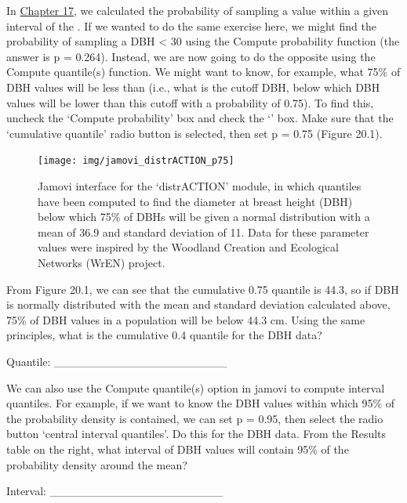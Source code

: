 \documentclass[
  openany]{krantz}
\begin{document}
In \protect\hyperlink{Chapter_17}{Chapter 17}, we calculated the probability of sampling a value within a given interval of the .
If we wanted to do the same exercise here, we might find the probability of sampling a DBH \textless{} 30 using the Compute probability function (the answer is p = 0.264).
Instead, we are now going to do the opposite using the Compute quantile(s) function.
We might want to know, for example, what 75\% of DBH values will be less than (i.e., what is the cutoff DBH, below which DBH values will be lower than this cutoff with a probability of 0.75).
To find this, uncheck the `Compute probability' box and check the `' box.
Make sure that the `cumulative quantile' radio button is selected, then set p = 0.75 (Figure 20.1).

\begin{figure}
\texttt{[image: img/jamovi\_distrACTION\_p75]} \caption{Jamovi interface for the `distrACTION' module, in which quantiles have been computed to find the diameter at breast height (DBH) below which 75\% of DBHs will be given a normal distribution with a mean of 36.9 and standard deviation of 11. Data for these parameter values were inspired by the Woodland Creation and Ecological Networks (WrEN) project.}\label{fig:unnamed-chunk-80}
\end{figure}

From Figure 20.1, we can see that the cumulative 0.75 quantile is 44.3, so if DBH is normally distributed with the mean and standard deviation calculated above, 75\% of DBH values in a population will be below 44.3 cm.
Using the same principles, what is the cumulative 0.4 quantile for the DBH data?

Quantile: \_\_\_\_\_\_\_\_\_\_\_\_\_\_\_\_\_\_\_\_\_

\newpage

We can also use the Compute quantile(s) option in jamovi to compute interval quantiles.
For example, if we want to know the DBH values within which 95\% of the probability density is contained, we can set p = 0.95, then select the radio button `central interval quantiles'.
Do this for the DBH data.
From the Results table on the right, what interval of DBH values will contain 95\% of the probability density around the mean?

Interval: \_\_\_\_\_\_\_\_\_\_\_\_\_\_\_\_\_\_\_\_\_
\end{document}

